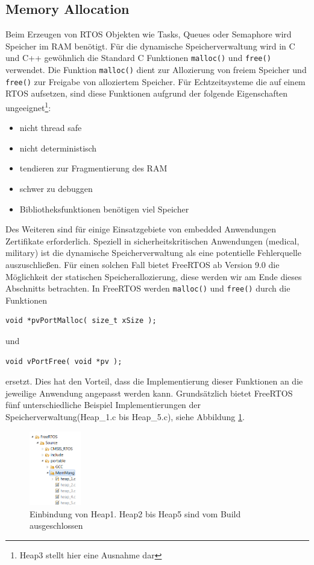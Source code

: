 \subsection{Memory Allocation}
Beim Erzeugen von RTOS Objekten wie Tasks, Queues oder Semaphore wird Speicher im RAM benötigt. Für die dynamische Speicherverwaltung wird in C und C++ ge\-wöhnlich die Standard C Funktionen \verb|malloc()| und \verb|free()| verwendet. Die Funktion \verb|malloc()| dient zur Allozierung von freiem Speicher und \verb|free()| zur Freigabe von alloziertem Speicher. Für Echtzeitsysteme die auf einem RTOS aufsetzen, sind diese Funktionen aufgrund der folgende Eigenschaften\cite{MasteringFreeRTOS} ungeeignet\footnote{Heap3 stellt hier eine Ausnahme dar}:
\begin{itemize}
	\item nicht thread safe
	\item nicht deterministisch
	\item tendieren zur Fragmentierung des RAM
	\item schwer zu debuggen
	\item Bibliotheksfunktionen benötigen viel Speicher
\end{itemize}
Des Weiteren sind für einige Einsatzgebiete von embedded Anwendungen Zertifikate erforderlich. Speziell in sicherheitskritischen Anwendungen (medical, military) ist die dynamische Speicherverwaltung als eine potentielle Fehlerquelle auszuschließen. Für einen solchen Fall bietet FreeRTOS ab Version 9.0 die Möglichkeit der statischen Speicherallozierung, diese werden wir am Ende dieses Abschnitts betrachten. In FreeRTOS werden  \verb|malloc()| und \verb|free()| durch die Funktionen  
\begin{lstlisting}[label=lst:vPortMallocFree, numbers = none]
void *pvPortMalloc( size_t xSize );
\end{lstlisting}
und
\begin{lstlisting}[label=lst:vPortMallocFree, numbers = none]
void vPortFree( void *pv );
\end{lstlisting}
ersetzt. Dies hat den Vorteil, dass die Implementierung dieser Funktionen an die jeweilige Anwendung angepasst werden kann. Grundsätzlich bietet FreeRTOS fünf unterschiedliche Beispiel Implementierungen der Speicherverwaltung(Heap\_1.c bis Heap\_5.c), siehe Abbildung \ref{fig:HeapsEclipse}. 
\begin{figure}[htb!]
	\centering
		\includegraphics[width=0.2\textwidth]{Pictures/Eclipse/Heaps.png}
	\caption{Einbindung von Heap1. Heap2 bis Heap5 sind vom Build ausgeschlossen}
	\label{fig:HeapsEclipse}
\end{figure}

